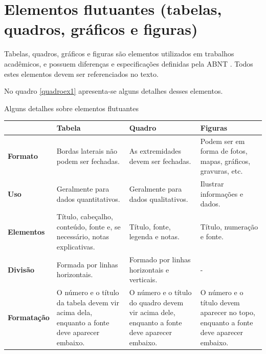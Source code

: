 \section{Elementos flutuantes (tabelas, quadros, gráficos e figuras)}

Tabelas, quadros, gráficos e figuras são elementos utilizados em trabalhos acadêmicos, e possuem diferenças e especificações definidas pela ABNT \cite{NBR14724:2011}. Todos estes elementos devem ser referenciados no texto.

No quadro \ref{quadroex1} apresenta-se alguns detalhes desses elementos.

\begin{quadro}[H]
	\centering
	\caption{Alguns detalhes sobre elementos flutuantes}
	\label{quadroex1}
	\begin{tabular}{|l|m{4cm}|m{4cm}|m{4cm}|}
		\hline
		& \textbf{Tabela}                                                                             & \textbf{Quadro}                                                                             & \textbf{Figuras}                                                                    \\ \hline
		\textbf{Formato}    & Bordas laterais não podem ser fechadas.                                                     & As extremidades devem ser fechadas.                                                         & Podem ser em forma de fotos, mapas, gráficos, gravuras, etc.                        \\ \hline
		\textbf{Uso}        & Geralmente para dados quantitativos.                                                        & Geralmente para dados qualitativos.                                                         & Ilustrar informações e dados.                                                       \\ \hline
		\textbf{Elementos}  & Título, cabeçalho, conteúdo, fonte e, se necessário, notas explicativas.                    & Título, fonte, legenda e notas.                                                             & Título, numeração e fonte.                                                          \\ \hline
		\textbf{Divisão}    & Formada por linhas horizontais.                                                               & Formado por linhas horizontais e verticais.                                                 & -                                                                                   \\ \hline
		\textbf{Formatação} & O número e o título da tabela devem vir acima dela, enquanto a fonte deve aparecer embaixo. & O número e o título do quadro devem vir acima dele, enquanto a fonte deve aparecer embaixo. & O número e o título devem aparecer no topo, enquanto a fonte deve aparecer embaixo. \\ \hline
	\end{tabular}
\end{quadro}


